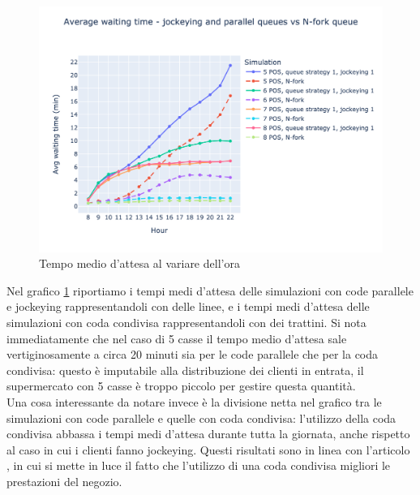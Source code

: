 \begin{figure}[H]
	\centering
	\includegraphics[width=12cm]{"images/results/avg_wt_codacondivisa.png"}

	\caption{Tempo medio d'attesa al variare dell'ora}
	\label{fig:avg_wt_codacondivisa}
\end{figure}

Nel grafico \ref{fig:avg_wt_codacondivisa} riportiamo i tempi medi d'attesa delle simulazioni con code parallele e jockeying rappresentandoli con delle linee, e i tempi medi d'attesa delle simulazioni con coda condivisa rappresentandoli con dei trattini. Si nota immediatamente che nel caso di 5 casse il tempo medio d'attesa sale vertiginosamente a circa 20 minuti sia per le code parallele che per la coda condivisa: questo è imputabile alla distribuzione dei clienti in entrata, il supermercato con 5 casse è troppo piccolo per gestire questa quantità. \\
Una cosa interessante da notare invece è la divisione netta nel
grafico tra le simulazioni con code parallele e quelle con coda
condivisa: l'utilizzo della coda condivisa abbassa i tempi medi
d'attesa durante tutta la giornata, anche rispetto al caso in cui i
clienti fanno jockeying. Questi risultati sono in linea con l'articolo
\cite{yanagisawa2011methods}, in cui si mette in luce il fatto che
l'utilizzo di una coda condivisa migliori le prestazioni del negozio.

